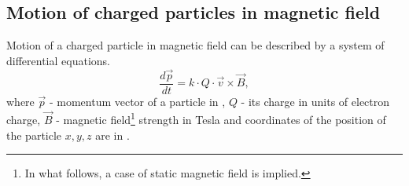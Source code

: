 \subsection{Motion of charged particles in magnetic field}
Motion of a charged particle in magnetic field can be described by a system of differential equations\cite{Spiridonov:2008ib}.
\begin{equation}
 \frac{d \vec{p}}{d t} = k \cdot Q \cdot \vec{v} \times \vec{B},
\end{equation}
where $\vec{p}$ - momentum vector of a particle in \GeVoverC, $Q$ - its charge in units of electron charge, $\vec{B}$ - magnetic field\footnote[1]{In what follows, a case of static magnetic field is implied.} strength in Tesla and coordinates of the position of the particle $x,y,z$ are in \cm. 
